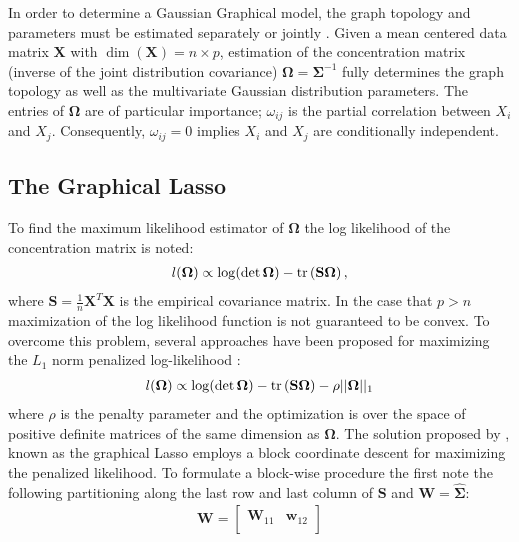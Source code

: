 \begin{DoubleSpace*}
In order to determine a Gaussian Graphical model, the graph topology and parameters must be estimated separately \cite{meinshausen2006} or jointly \cite{friedman2007,yuan2007,banerjee2008}. Given a mean centered data matrix $\textbf{X}$ with $\dim(\textbf{X})=n\times p$, estimation of the concentration matrix (inverse of the joint distribution covariance) $\boldsymbol{\Omega}=\boldsymbol{\Sigma}^{-1}$ fully determines the graph topology as well as the multivariate Gaussian distribution parameters. The entries of $\boldsymbol{\Omega}$ are of particular importance; $\omega_{ij}$ is the partial correlation between $X_i$ and $X_j$. Consequently, $\omega_{ij}=0$ implies $X_i$ and $X_j$ are conditionally independent.

\subsection{The Graphical Lasso}
To find the maximum likelihood estimator of $\boldsymbol{\Omega}$ the log likelihood of the concentration matrix is noted:
\begin{align} 
l(\boldsymbol{\Omega})\propto\log (\det \boldsymbol{\Omega})-\operatorname{tr} \left( \textbf{S} \boldsymbol{\Omega} \right),
\end{align}
where $\textbf{S}=\frac{1}{n}\textbf{X}^T \textbf{X}$ is the empirical covariance matrix. In the case that $p>n$ maximization of the log likelihood function is not guaranteed to be convex. To overcome this problem, several approaches have been proposed for maximizing the $L_1$ norm penalized log-likelihood \cite{friedman2007,yuan2007,banerjee2008}:
\begin{align}
l(\boldsymbol{\Omega})\propto\log (\det \boldsymbol{\Omega})-\operatorname{tr} \left( \textbf{S} \boldsymbol{\Omega} \right)-\rho ||\boldsymbol{\Omega}||_1
\label{eq:likelihood}
\end{align}
where $\rho$ is the penalty parameter and the optimization is over the space of positive definite matrices of the same dimension as $\boldsymbol{\Omega}$.
The solution proposed by \cite{friedman2007}, known as the graphical Lasso employs a block coordinate descent for maximizing the penalized likelihood. To formulate a block-wise procedure the \cite{friedman2007} first note the following partitioning along the last row and last column of $\textbf{S}$ and $\textbf{W}=\hat{\boldsymbol{\Sigma}}$:
\begin{align}
\textbf{W}=
\begin{bmatrix}
\textbf{W}_{11} & \textbf{w}_{12} \\

\end{bmatrix}
\end{align}
\end{DoubleSpace*}

